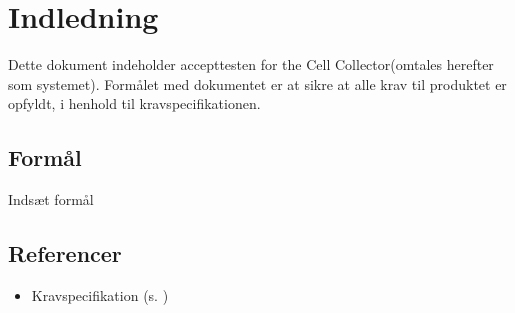 \section{Indledning}
Dette dokument indeholder accepttesten for the Cell Collector(omtales herefter som systemet). Formålet med dokumentet er at sikre at alle krav til produktet er opfyldt, i henhold til kravspecifikationen.

\subsection{Formål}
Indsæt formål

\subsection{Referencer}
\begin{itemize}
\item Kravspecifikation (s. \pageref{ch:ks})
\end{itemize}